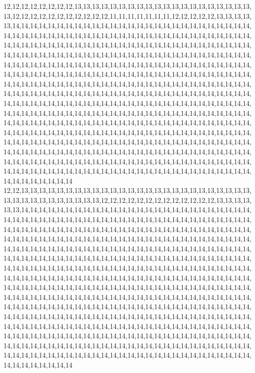 12,12,12,12,12,12,12,12,13,13,13,13,13,13,13,13,13,13,13,13,13,13,13,13,13,13,13,13,13,12,12,12,12,12,12,12,12,12,12,12,11,11,11,11,11,11,11,12,12,12,12,12,13,13,13,13,13,14,14,14,14,14,14,14,14,14,14,14,14,14,14,14,14,14,14,14,14,14,14,14,14,14,14,14,14,14,14,14,14,14,14,14,14,14,14,14,14,14,14,14,14,14,14,14,14,14,14,14,14,14,14,14,14,14,14,14,14,14,14,14,14,14,14,14,14,14,14,14,14,14,14,14,14,14,14,14,14,14,14,14,14,14,14,14,14,14,14,14,14,14,14,14,14,14,14,14,14,14,14,14,14,14,14,14,14,14,14,14,14,14,14,14,14,14,14,14,14,14,14,14,14,14,14,14,14,14,14,14,14,14,14,14,14,14,14,14,14,14,14,14,14,14,14,14,14,14,14,14,14,14,14,14,14,14,14,14,14,14,14,14,14,14,14,14,14,14,14,14,14,14,14,14,14,14,14,14,14,14,14,14,14,14,14,14,14,14,14,14,14,14,14,14,14,14,14,14,14,14,14,14,14,14,14,14,14,14,14,14,14,14,14,14,14,14,14,14,14,14,14,14,14,14,14,14,14,14,14,14,14,14,14,14,14,14,14,14,14,14,14,14,14,14,14,14,14,14,14,14,14,14,14,14,14,14,14,14,14,14,14,14,14,14,14,14,14,14,14,14,14,14,14,14,14,14,14,14,14,14,14,14,14,14,14,14,14,14,14,14,14,14,14,14,14,14,14,14,14,14,14,14,14,14,14,14,14,14,14,14,14,14,14,14,14,14,14,14,14,14,14,14,14,14,14,14,14,14,14,14,14,14,14,14,14,14,14,14,14,14,14,14,14,14,14,14,14,14,14,14,14,14,14,14,14,14,14,14,14,14,14,14,14,14,14,14,14,14,14,14,14,14,14,14,14,14,14,14,14,14,14,14,14,14,14,14,14,14,14,14,14,14,14,14,14,14,14,14,14,14,14,14,14,14,14,14,14,14,14,14,14,14,14,14,14,14,14,14,14,14,14,14,14,14,14,14,14,14,14,14,14,14,14,14,14,14,14,14,14,14,14,14,14,14,14,14,14,14,14,14,14,14,14,14
12,12,13,13,13,13,13,13,13,13,13,13,13,13,13,13,13,13,13,13,13,13,13,13,13,13,13,13,13,13,13,13,13,13,13,13,13,13,13,12,12,12,12,12,12,12,12,12,12,12,12,12,13,13,13,13,13,13,14,14,14,14,14,14,14,14,14,14,14,14,14,14,14,14,14,14,14,14,14,14,14,14,14,14,14,14,14,14,14,14,14,14,14,14,14,14,14,14,14,14,14,14,14,14,14,14,14,14,14,14,14,14,14,14,14,14,14,14,14,14,14,14,14,14,14,14,14,14,14,14,14,14,14,14,14,14,14,14,14,14,14,14,14,14,14,14,14,14,14,14,14,14,14,14,14,14,14,14,14,14,14,14,14,14,14,14,14,14,14,14,14,14,14,14,14,14,14,14,14,14,14,14,14,14,14,14,14,14,14,14,14,14,14,14,14,14,14,14,14,14,14,14,14,14,14,14,14,14,14,14,14,14,14,14,14,14,14,14,14,14,14,14,14,14,14,14,14,14,14,14,14,14,14,14,14,14,14,14,14,14,14,14,14,14,14,14,14,14,14,14,14,14,14,14,14,14,14,14,14,14,14,14,14,14,14,14,14,14,14,14,14,14,14,14,14,14,14,14,14,14,14,14,14,14,14,14,14,14,14,14,14,14,14,14,14,14,14,14,14,14,14,14,14,14,14,14,14,14,14,14,14,14,14,14,14,14,14,14,14,14,14,14,14,14,14,14,14,14,14,14,14,14,14,14,14,14,14,14,14,14,14,14,14,14,14,14,14,14,14,14,14,14,14,14,14,14,14,14,14,14,14,14,14,14,14,14,14,14,14,14,14,14,14,14,14,14,14,14,14,14,14,14,14,14,14,14,14,14,14,14,14,14,14,14,14,14,14,14,14,14,14,14,14,14,14,14,14,14,14,14,14,14,14,14,14,14,14,14,14,14,14,14,14,14,14,14,14,14,14,14,14,14,14,14,14,14,14,14,14,14,14,14,14,14,14,14,14,14,14,14,14,14,14,14,14,14,14,14,14,14,14,14,14,14,14,14,14,14,14,14,14,14,14,14,14,14,14,14,14,14,14,14,14,14,14,14,14,14,14,14,14,14,14,14,14,14,14,14,14,14,14,14,14,14,14,14,14,14,14,14,14,14
